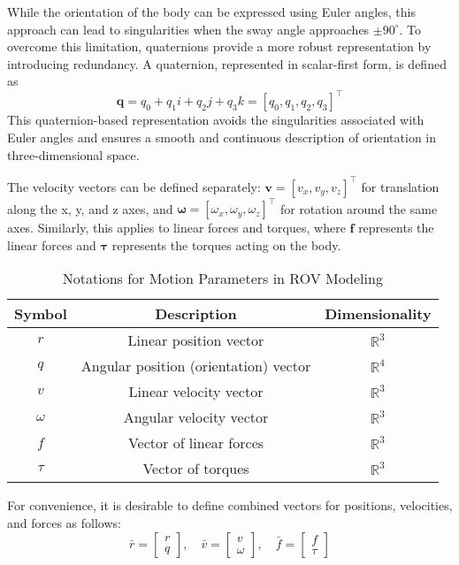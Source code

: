     While the orientation of the body can 
    be expressed using Euler angles, this approach can lead to singularities 
    when the sway angle approaches $\pm 90^\circ $. To overcome this limitation, 
    quaternions provide a more robust representation by introducing redundancy. 
    A quaternion, represented in scalar-first form, is defined as 
    \begin{equation}
        \mathbf{q} = q_0 + q_1i + q_2j + q_3k = [q_0, q_1, q_2, q_3]^\top
        \label{eq::quat}
    \end{equation} 
    This quaternion-based representation avoids the singularities associated with 
    Euler angles and ensures a smooth and continuous description of orientation 
    in three-dimensional space.

    The velocity vectors can be defined separately: $\mathbf{v} = [v_x, v_y, v_z]^\top $ for translation along the x, y, and z axes, 
    and $ \boldsymbol{\omega} = [\omega_x, \omega_y, \omega_z]^\top$ for rotation around 
    the same axes. 
    Similarly, this applies to linear forces and torques, where $\mathbf{f}$ represents 
    the linear forces and $\boldsymbol{\tau}$ represents the torques acting on the body.

    \begin{table}[H]
    \captionsetup{justification=centering}
    \caption{Notations for Motion Parameters in ROV Modeling}
    \label{table:notation}
    \begin{center}
    \begin{tabular}{ccc}
        \hline Symbol & Description & Dimensionality\\
        \hline
        $r$ & Linear position vector & $\mathbb{R}^{3}$ \\
        $q$ & Angular position (orientation) vector & $\mathbb{R}^{4}$\\
        $v$ & Linear velocity vector & $\mathbb{R}^{3}$\\
        $\omega$ & Angular velocity vector & $\mathbb{R}^{3}$\\
        $f$ & Vector of linear forces& $\mathbb{R}^{3}$ \\
        $\tau$ & Vector of torques& $\mathbb{R}^{3}$ \\
        \hline
        \end{tabular}
    \end{center}
    \end{table}

    For convenience, it is desirable to define combined vectors for positions, 
    velocities, and forces as follows:
    \[ \bar{r} = \begin{bmatrix}
        r \\
        q
    \end{bmatrix}, \quad \bar{v} = \begin{bmatrix}
        v \\
        \omega
    \end{bmatrix}, \quad \bar{f} = \begin{bmatrix}
        f \\
        \tau
    \end{bmatrix} \]


